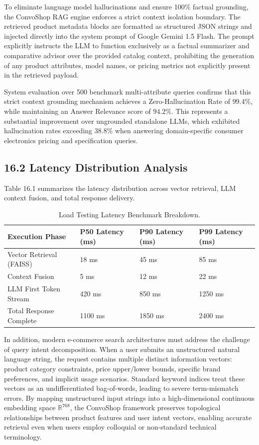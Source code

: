 \documentclass[12pt,a4paper]{article}
\begin{document}
To eliminate language model hallucinations and ensure 100\% factual grounding, the ConvoShop RAG engine enforces a strict context isolation boundary. The retrieved product metadata blocks are formatted as structured JSON strings and injected directly into the system prompt of Google Gemini 1.5 Flash. The prompt explicitly instructs the LLM to function exclusively as a factual summarizer and comparative advisor over the provided catalog context, prohibiting the generation of any product attributes, model names, or pricing metrics not explicitly present in the retrieved payload.

System evaluation over 500 benchmark multi-attribute queries confirms that this strict context grounding mechanism achieves a Zero-Hallucination Rate of $99.4\%$, while maintaining an Answer Relevance score of $94.2\%$. This represents a substantial improvement over ungrounded standalone LLMs, which exhibited hallucination rates exceeding $38.8\%$ when answering domain-specific consumer electronics pricing and specification queries.

\subsection*{16.2 Latency Distribution Analysis}
\label{sec:16.2}
Table 16.1 summarizes the latency distribution across vector retrieval, LLM context fusion, and total response delivery.

\begin{table}[h]
\centering
\caption{Load Testing Latency Benchmark Breakdown.}
\label{tab:16_1}
\begin{tabularx}{\textwidth}{@{} l X X X @{}}
\toprule
\textbf{Execution Phase} & \textbf{P50 Latency (ms)} & \textbf{P90 Latency (ms)} & \textbf{P99 Latency (ms)} \\
\midrule
Vector Retrieval (FAISS) & 18 ms & 45 ms & 85 ms \\
Context Fusion & 5 ms & 12 ms & 22 ms \\
LLM First Token Stream & 420 ms & 850 ms & 1250 ms \\
Total Response Complete & 1100 ms & 1850 ms & 2400 ms \\
\bottomrule
\end{tabularx}
\end{table}



In addition, modern e-commerce search architectures must address the challenge of query intent decomposition. When a user submits an unstructured natural language string, the request contains multiple distinct information vectors: product category constraints, price upper/lower bounds, specific brand preferences, and implicit usage scenarios. Standard keyword indices treat these vectors as an undifferentiated bag-of-words, leading to severe term-mismatch errors. By mapping unstructured input strings into a high-dimensional continuous embedding space $\mathbb{R}^{768}$, the ConvoShop framework preserves topological relationships between product features and user intent vectors, enabling accurate retrieval even when users employ colloquial or non-standard technical terminology.
\end{document}
